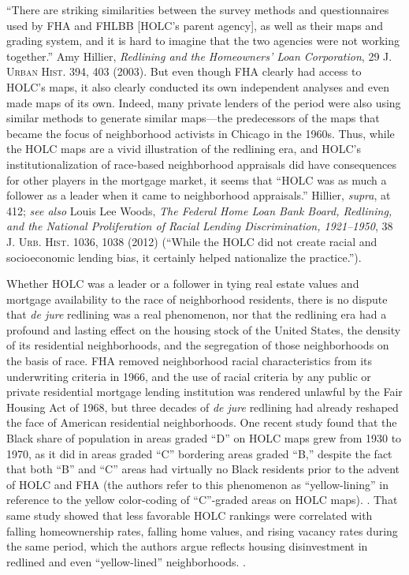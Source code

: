 ``There are striking similarities between the survey methods and
questionnaires used by FHA and FHLBB [HOLC's parent agency], as well as their
maps and grading system, and it is hard to imagine that the two agencies were
not working together.'' Amy Hillier, \textit{Redlining and the Homeowners' Loan
Corporation}, 29 \textsc{J. Urban Hist.} 394, 403 (2003). But even though FHA
clearly had access to HOLC's maps, it also clearly conducted its own
independent analyses and even made maps of its own. Indeed, many private
lenders of the period were also using similar methods to generate similar
maps---the predecessors of the maps that became the focus of neighborhood
activists in Chicago in the 1960s. Thus, while the HOLC maps are a vivid
illustration of the redlining era, and HOLC's institutionalization of
race-based neighborhood appraisals did have consequences for other players in
the mortgage market, it seems that ``HOLC was as much a follower as a leader
when it came to neighborhood appraisals.'' Hillier, \textit{supra}, at 412;
\textit{see also} Louis Lee Woods, \textit{The Federal Home Loan Bank Board,
Redlining, and the National Proliferation of Racial Lending Discrimination,
1921--1950}, 38 \textsc{J. Urb. Hist.} 1036, 1038 (2012) (``While the HOLC did
not create racial and socioeconomic lending bias, it certainly helped
nationalize the practice.'').

Whether HOLC was a leader or a follower in tying real estate values and mortgage
availability to the race of neighborhood residents, there is no dispute that
\textit{de jure} redlining was a real phenomenon, nor that the redlining era
had a profound and lasting effect on the housing stock of the United States,
the density of its residential neighborhoods, and the segregation of those
neighborhoods on the basis of race. FHA removed neighborhood racial
characteristics from its underwriting criteria in 1966, and the use of racial
criteria by any public or private residential mortgage lending institution was
rendered unlawful by the Fair Housing Act of 1968, but three decades of
\textit{de jure} redlining had already reshaped the face of American
residential neighborhoods. One recent study found that the Black share of
population in areas graded ``D'' on HOLC maps grew from 1930 to 1970, as it did
in areas graded ``C'' bordering areas graded ``B,'' despite the fact that both
``B'' and ``C'' areas had virtually no Black residents prior to the advent of
HOLC and FHA (the authors refer to this phenomenon as ``yellow-lining'' in
reference to the yellow color-coding of ``C''-graded areas on HOLC
maps). .
That same study showed that less favorable HOLC rankings were correlated with
falling homeownership rates, falling home values, and rising vacancy rates
during the same period, which the authors argue reflects housing disinvestment
in redlined and even ``yellow-lined'' neighborhoods.
.

